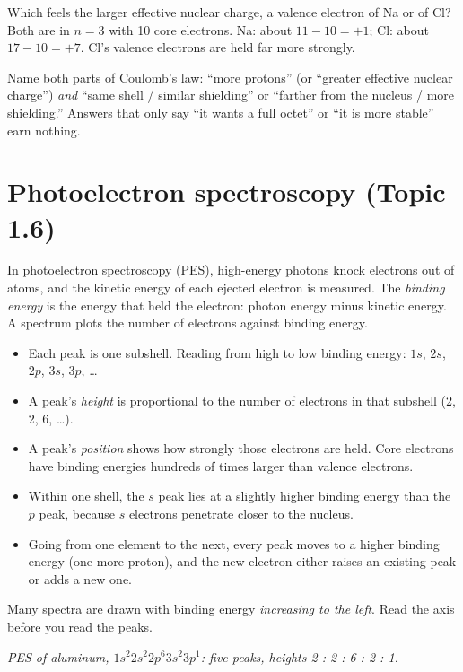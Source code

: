 \documentclass[11pt]{article}
\begin{document}
 Which feels the larger effective nuclear charge, a valence electron of Na or of Cl? Both are in $n = 3$ with 10 core electrons. Na: about $11 - 10 = +1$; Cl: about $17 - 10 = +7$. Cl's valence electrons are held far more strongly.

\frph Name both parts of Coulomb's law: ``more protons'' (or ``greater effective nuclear charge'') \emph{and} ``same shell / similar shielding'' or ``farther from the nucleus / more shielding.'' Answers that only say ``it wants a full octet'' or ``it is more stable'' earn nothing.

\section{Photoelectron spectroscopy (Topic 1.6)}\label{t:1.6}
In photoelectron spectroscopy (PES), high-energy photons knock electrons out of atoms, and the kinetic energy of each ejected electron is measured. The \emph{binding energy} is the energy that held the electron: photon energy minus kinetic energy. A spectrum plots the number of electrons against binding energy.
\begin{itemize}
\item Each peak is one subshell. Reading from high to low binding energy: $1s$, $2s$, $2p$, $3s$, $3p$, \ldots
\item A peak's \emph{height} is proportional to the number of electrons in that subshell (2, 2, 6, \dots).
\item A peak's \emph{position} shows how strongly those electrons are held. Core electrons have binding energies hundreds of times larger than valence electrons.
\item Within one shell, the $s$ peak lies at a slightly higher binding energy than the $p$ peak, because $s$ electrons penetrate closer to the nucleus.
\item Going from one element to the next, every peak moves to a higher binding energy (one more proton), and the new electron either raises an existing peak or adds a new one.
\end{itemize}
Many spectra are drawn with binding energy \emph{increasing to the left}. Read the axis before you read the peaks.

\begin{center}

{\small\itshape PES of aluminum, $1s^2 2s^2 2p^6 3s^2 3p^1$: five peaks, heights 2 : 2 : 6 : 2 : 1.}
\end{center}
\end{document}
